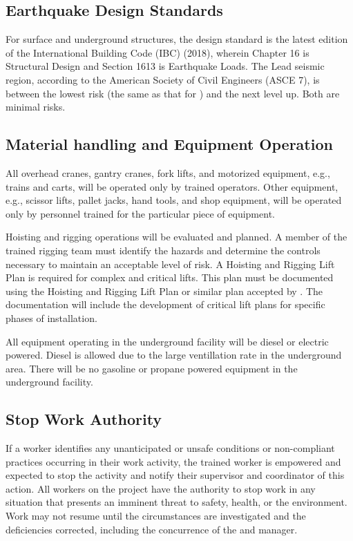 \subsection{Earthquake Design Standards}

For surface and underground structures, the design standard is the
latest edition of the International Building Code (IBC) (2018), wherein
Chapter 16  is Structural Design and Section 1613 is Earthquake
Loads. The Lead seismic region, according to the American Society of
Civil Engineers (ASCE 7), is between the lowest risk (the same as that 
for \fnal) and the next level up. Both are minimal risks.

\subsection{Material handling and Equipment Operation}

All overhead cranes, gantry cranes, fork lifts, and motorized equipment,
e.g., trains and carts, will be operated only by trained
operators. Other equipment, e.g., scissor lifts, pallet jacks, hand
tools, and shop equipment, will be operated only by personnel trained
for the particular piece of equipment. 

Hoisting and rigging operations will be evaluated and planned.  A
member of the trained rigging team must identify the hazards and
determine the controls necessary to maintain an acceptable level of
risk.  A Hoisting and Rigging Lift Plan is required for complex and
critical lifts. This plan must be documented using the \fnal Hoisting
and Rigging Lift Plan or similar plan accepted by \fnal. The 
 documentation will include the development of critical lift
plans for specific phases of installation. %

All equipment operating in the underground facility will be diesel or
electric powered. Diesel is allowed due to the large
ventillation rate in the underground area.  There will be no gasoline or propane powered
equipment in the underground facility.

\subsection{Stop Work Authority}

If a worker identifies any unanticipated or unsafe conditions %
or non-compliant
practices occurring in their work activity, %
the trained worker is empowered and expected to stop the activity
 and notify their supervisor and   coordinator of
this action. All workers on the  project have the
authority to stop work in any situation that presents an imminent
threat to safety, health, or the environment. Work may not resume
until the circumstances are investigated and the deficiencies corrected,
including the concurrence of the  
and   manager.

